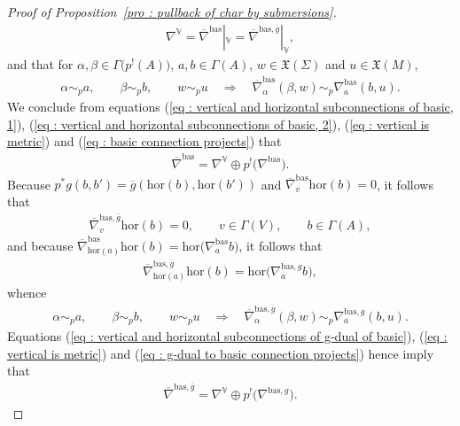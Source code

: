 \documentclass[11pt]{article}
\numberwithin{equation}{section}
\newcommand{\8}{\infty}
\newcommand{\X}{\mathfrak{X}}
\begin{document}
\begin{proof}[Proof of Proposition~\ref{pro : pullback of char by submersions}]
 \begin{gather}\label{eq : vertical is metric}
 \nabla^{\mathbb{V}}=\overline{\nabla}^{\mathrm{bas}}|_{\mathbb{V}} = \overline{\nabla}^{\mathrm{bas},\overline{g}}|_{\mathbb{V}},
 \end{gather}and that for $\alpha,\beta \in \Gamma\big(p^!(A)\big)$, $a,b \in \Gamma(A)$, $w \in \X(\Sigma)$ and $u \in \X(M)$,
\begin{gather}\label{eq : basic connection projects}
 \alpha \sim_p a, \qquad \beta \sim_p b, \qquad w \sim_p u \quad \Longrightarrow \quad \overline{\nabla}^{\mathrm{bas}}_{\alpha}(\beta,w) \sim_p \nabla^{\mathrm{bas}}_{a}(b,u).
\end{gather}We conclude from equations (\ref{eq : vertical and horizontal subconnections of basic, 1}), (\ref{eq : vertical and horizontal subconnections of basic, 2}), (\ref{eq : vertical is metric}) and (\ref{eq : basic connection projects}) that
\begin{gather}\label{eq : basic connection splits}
 \overline{\nabla}^{\mathrm{bas}} = \nabla^{\mathbb{V}} \oplus p^!\big(\nabla^{\mathrm{bas}}\big).
\end{gather}Because $p^*g(b,b')=\overline{g}(\mathrm{hor}(b),\mathrm{hor}(b'))$ and $\overline{\nabla}^{\mathrm{bas}}_v\mathrm{hor}(b)=0$, it follows that
\begin{gather*}
 \overline{\nabla}^{\mathrm{bas},\overline{g}}_v\mathrm{hor}(b) = 0, \qquad v \in \Gamma(V), \qquad b \in \Gamma(A),
\end{gather*}and because $\overline{\nabla}^{\mathrm{bas}}_{\mathrm{hor}(a)}\mathrm{hor}(b) = \mathrm{hor}\big(\nabla^{\mathrm{bas}}_{a}b\big)$, it follows that
\begin{gather*}
 \overline{\nabla}^{\mathrm{bas},\overline{g}}_{\mathrm{hor}(a)}\mathrm{hor}(b) = \mathrm{hor}\big(\nabla^{\mathrm{bas},g}_{a}b\big),
\end{gather*}whence
\begin{gather}\label{eq : g-dual to basic connection projects}
 \alpha \sim_p a, \qquad \beta \sim_p b, \qquad w \sim_p u \quad \Longrightarrow \quad \overline{\nabla}^{\mathrm{bas},\overline{g}}_{\alpha}(\beta,w) \sim_p \nabla^{\mathrm{bas},g}_{a}(b,u).
\end{gather}Equations (\ref{eq : vertical and horizontal subconnections of g-dual of basic}), (\ref{eq : vertical is metric}) and (\ref{eq : g-dual to basic connection projects}) hence imply that
\begin{gather}\label{eq : g-dual to basic connection splits}
 \overline{\nabla}^{\mathrm{bas},\overline{g}} = \nabla^{\mathbb{V}} \oplus p^!\big(\nabla^{\mathrm{bas},g}\big).
\end{gather}


\end{proof}
\end{document}
